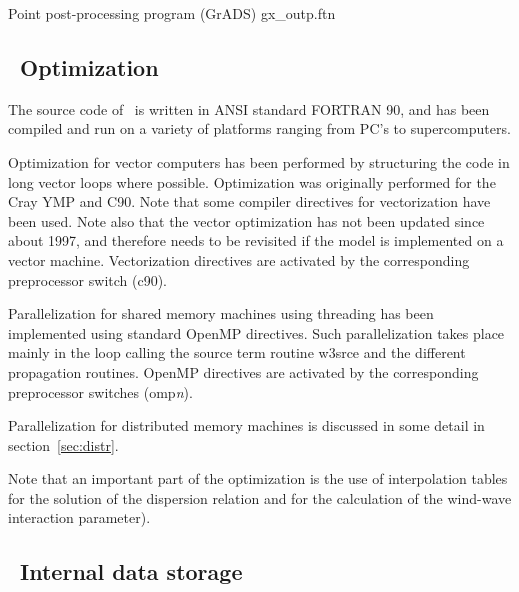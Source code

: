 \noindent
Point post-processing program (GrADS) \hfill {\file gx\_outp.ftn}

\begin{flisti}
\end{flisti}




\subsection{~Optimization} \label{sec:optim}
\vssub

The source code of \ws\ is written in ANSI standard FORTRAN 90, and has been
compiled and run on a variety of platforms ranging from PC's to
supercomputers.

Optimization for vector computers has been performed by structuring the code
in long vector loops where possible. Optimization was originally performed for
the Cray YMP and C90. Note that some compiler directives for vectorization
have been used. Note also that the vector optimization has not been updated
since about 1997, and therefore needs to be revisited if the model is
implemented on a vector machine. Vectorization directives are activated by the
corresponding preprocessor switch ({\F c90}).

Parallelization for shared memory machines using threading has been
implemented using standard OpenMP directives. Such parallelization takes place
mainly in the loop calling the source term routine {\F w3srce} and the
different propagation routines. OpenMP directives are activated by the
corresponding preprocessor switches ({\F omp}{\it n}).

Parallelization for distributed memory machines is discussed in some detail in
section~\ref{sec:distr}.

Note that an important part of the optimization is the use of interpolation
tables for the solution of the dispersion relation and for the calculation of
the wind-wave interaction parameter).


\vssub
\subsection{~Internal data storage} \label{sec:common}
\vssub

